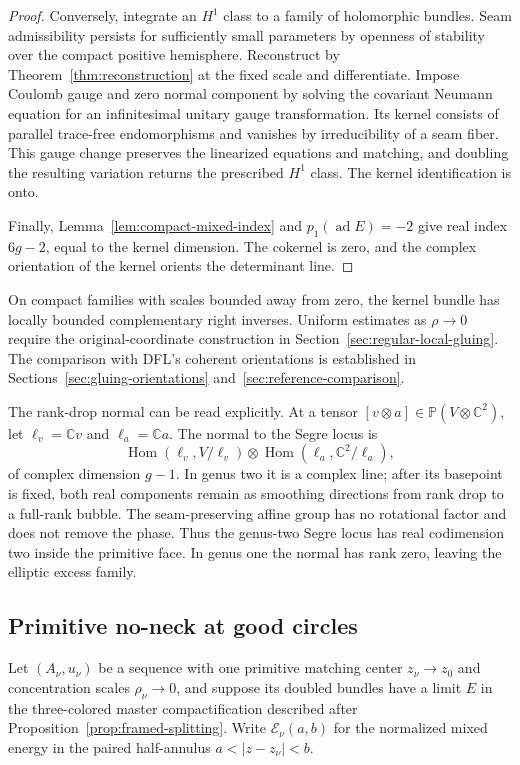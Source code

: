 \documentclass[11pt]{amsart}
\theoremstyle{definition}
\theoremstyle{remark}
\theoremstyle{plain}
\newcommand{\CC}{\mathbb{C}}
\newcommand{\PP}{\mathbb{P}}
\newcommand{\cE}{\mathcal{E}}
\newcommand{\ad}{\operatorname{ad}}
\newcommand{\Hom}{\operatorname{Hom}}
\begin{document}
\begin{proof}
Conversely, integrate an $H^1$ class to a family of holomorphic bundles.
Seam admissibility persists for sufficiently small parameters by
openness of stability over the compact positive hemisphere. Reconstruct
by Theorem~\ref{thm:reconstruction} at the fixed scale and differentiate.
Impose Coulomb gauge and zero normal component by solving the covariant
Neumann equation for an infinitesimal unitary gauge transformation.
Its kernel consists of parallel trace-free endomorphisms and vanishes
by irreducibility of a seam fiber. This gauge change preserves the
linearized equations and matching, and doubling the resulting variation
returns the prescribed $H^1$ class. The kernel identification is onto.

Finally, Lemma~\ref{lem:compact-mixed-index} and $p_1(\ad E)=-2$ give
real index $6g-2$, equal to the kernel dimension. The cokernel is zero,
and the complex orientation of the kernel orients the determinant line.
\end{proof}

On compact families with scales bounded away from zero, the kernel
bundle has locally bounded complementary right inverses. Uniform
estimates as $\rho\to0$ require the original-coordinate construction
in Section~\ref{sec:regular-local-gluing}. The comparison with DFL's
coherent orientations is established in
Sections~\ref{sec:gluing-orientations} and~\ref{sec:reference-comparison}.

The rank-drop normal can be read explicitly.  At a tensor
$[v\otimes a]\in\PP(V\otimes\CC^2)$, let
$\ell_v=\CC v$ and $\ell_a=\CC a$.  The normal to the Segre locus is
\begin{equation}\label{eq:Segre-normal}
 \Hom(\ell_v,V/\ell_v)\otimes
 \Hom(\ell_a,\CC^2/\ell_a),
\end{equation}
of complex dimension $g-1$.  In genus two it is a complex line; after its
basepoint is fixed, both real components remain as smoothing directions
from rank drop to a full-rank bubble.  The seam-preserving affine group has
no rotational factor and does not remove the phase.  Thus the genus-two
Segre locus has real codimension two inside the primitive face.  In genus
one the normal has rank zero, leaving the elliptic excess family.

\subsection{Primitive no-neck at good circles}\label{sec:primitive-no-neck}
Let $(A_\nu,u_\nu)$ be a sequence with one primitive matching center
$z_\nu\to z_0$ and concentration scales $\rho_\nu\to0$, and suppose its
doubled bundles have a limit $E$ in the three-colored master
compactification described after Proposition~\ref{prop:framed-splitting}.
Write
$\cE_\nu(a,b)$ for the normalized mixed energy in the paired half-annulus
$a<|z-z_\nu|<b$.
\end{document}

